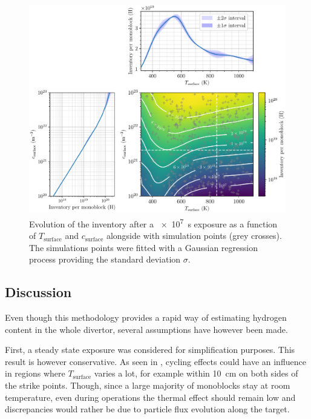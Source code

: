 \begin{figure} [h]
    \centering
    \includegraphics[width=\linewidth]{Figures/Chapter3/monoblocks/parametric_study/inventory_T_c_profiles.pdf}
    \caption{Evolution of the inventory after a \SI{e7}{s} exposure as a function of $T_\mathrm{surface}$ and $c_\mathrm{surface}$ alongside with simulation points (grey crosses). The simulations points were fitted with a Gaussian regression process \cite{chris_bowman_c-bowmaninference-tools_2020} providing the standard deviation $\sigma$.}
\end{figure}

\subsection{Discussion}
Even though this methodology provides a rapid way of estimating hydrogen content in the whole divertor, several assumptions have however been made.


First, a steady state exposure was considered for simplification purposes.
This result is however conservative.
As seen in , cycling effects could have an influence in regions where $T_\mathrm{surface}$ varies a lot, for example within \SI{10}{cm} on both sides of the strike points.
Though, since a large majority of monoblocks stay at room temperature, even during operations the thermal effect should remain low and discrepancies would rather be due to particle flux evolution along the target.

